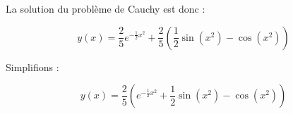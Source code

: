 \documentclass{article}
\begin{document}
La solution du problème de Cauchy est donc :

\begin{equation*}
y(x) = \frac{2}{5} e^{ - \frac{1}{2} x^2 } + \frac{2}{5} \left( \dfrac{1}{2} \sin( x^2 ) - \cos( x^2 ) \right )
\end{equation*}

Simplifions :

\begin{equation*}
y(x) = \frac{2}{5} \left( e^{ - \frac{1}{2} x^2 } + \dfrac{1}{2} \sin( x^2 ) - \cos( x^2 ) \right )
\end{equation*}
\end{document}
